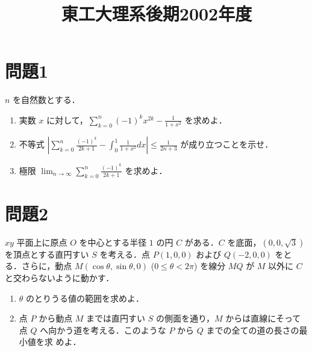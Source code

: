 \documentclass[unicode,12pt, a4paper]{ltjsarticle}%
\title{東工大理系後期2002年度}
\begin{document}
\maketitle
\section{問題1}
$n$ を自然数とする．

\begin{enumerate}
    \item 
    実数 $x$ に対して，$\displaystyle \sum_{k=0}^{n} (-1)^k x^{2k} - \frac{1}{1+x^2}$ を求めよ．

    \item 
    不等式 $\displaystyle \left| \sum_{k=0}^{n} \frac{(-1)^k}{2k+1} - \int_0^1 \frac{1}{1+x^2} dx \right| \leq \frac{1}{2n+3}$ が成り立つことを示せ．

    \item 
    極限 $\displaystyle \lim_{n \to \infty} \sum_{k=0}^{n} \frac{(-1)^k}{2k+1}$ を求めよ．
\end{enumerate}


\section{問題2}
$xy$ 平面上に原点 $O$ を中心とする半径 $1$ の円 $C$ がある．$C$ を底面，$(0,0,\sqrt{3})$ を頂点とする直円すい $S$ を考える．点 $P(1,0,0)$ および $Q(-2,0,0)$ をとる．さらに，動点 $M(\cos\theta,\sin\theta,0)$ ($0 \leq \theta < 2\pi$) を線分 $MQ$ が $M$ 以外に $C$ と交わらないように動かす．

\begin{enumerate}
    \item 
    $\theta$ のとりうる値の範囲を求めよ．

    \item 
    点 $P$ から動点 $M$ までは直円すい $S$ の側面を通り，$M$ からは直線にそって点 $Q$ へ向かう道を考える．このような $P$ から $Q$ までの全ての道の長さの最小値を求 めよ．
\end{enumerate}
\end{document}
